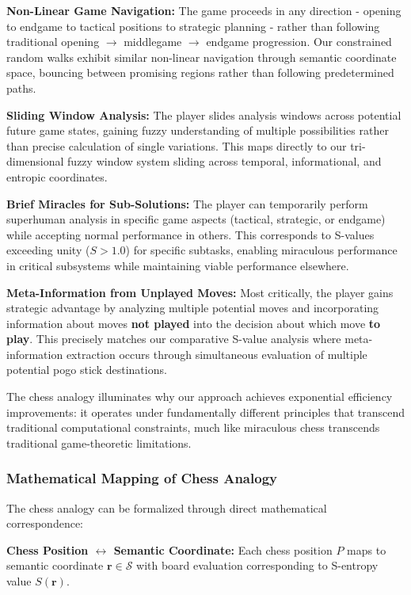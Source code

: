 \documentclass[12pt,a4paper]{article}
\begin{document}
\textbf{Non-Linear Game Navigation:} The game proceeds in any direction - opening to endgame to tactical positions to strategic planning - rather than following traditional opening $\to$ middlegame $\to$ endgame progression. Our constrained random walks exhibit similar non-linear navigation through semantic coordinate space, bouncing between promising regions rather than following predetermined paths.

\textbf{Sliding Window Analysis:} The player slides analysis windows across potential future game states, gaining fuzzy understanding of multiple possibilities rather than precise calculation of single variations. This maps directly to our tri-dimensional fuzzy window system sliding across temporal, informational, and entropic coordinates.

\textbf{Brief Miracles for Sub-Solutions:} The player can temporarily perform superhuman analysis in specific game aspects (tactical, strategic, or endgame) while accepting normal performance in others. This corresponds to S-values exceeding unity ($S > 1.0$) for specific subtasks, enabling miraculous performance in critical subsystems while maintaining viable performance elsewhere.

\textbf{Meta-Information from Unplayed Moves:} Most critically, the player gains strategic advantage by analyzing multiple potential moves and incorporating information about moves \textbf{not played} into the decision about which move \textbf{to play}. This precisely matches our comparative S-value analysis where meta-information extraction occurs through simultaneous evaluation of multiple potential pogo stick destinations.

The chess analogy illuminates why our approach achieves exponential efficiency improvements: it operates under fundamentally different principles that transcend traditional computational constraints, much like miraculous chess transcends traditional game-theoretic limitations.

\subsubsection{Mathematical Mapping of Chess Analogy}

The chess analogy can be formalized through direct mathematical correspondence:

\textbf{Chess Position $\leftrightarrow$ Semantic Coordinate:} Each chess position $P$ maps to semantic coordinate $\mathbf{r} \in \mathcal{S}$ with board evaluation corresponding to S-entropy value $S(\mathbf{r})$.
\end{document}
